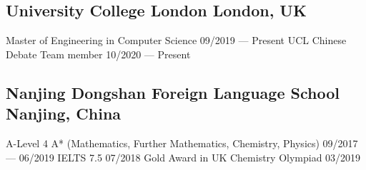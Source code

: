 
\subsection{University College London \hfill London, UK}
    Master of Engineering in Computer Science 
        \hfill 09/2019 --- Present 
    \newline
    UCL Chinese Debate Team member
        \hfill 10/2020 --- Present


\vspace{0.3em}


\subsection{Nanjing Dongshan Foreign Language School \hfill Nanjing, China}
    A-Level 4 A* (Mathematics, Further Mathematics, Chemistry, Physics) 
        \hfill 09/2017 --- 06/2019 
    \newline
    IELTS 7.5 
        \hfill 07/2018 
    \newline
    Gold Award in UK Chemistry Olympiad
        \hfill 03/2019


